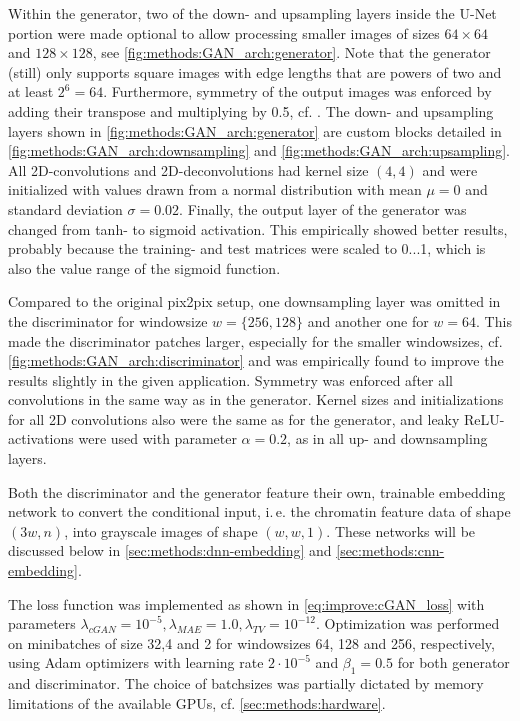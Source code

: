 Within the generator, two of the down- and upsampling layers inside the U-Net portion were made optional 
to allow processing smaller images of sizes $64\times64$ and $128\times128$, see \cref{fig:methods:GAN_arch:generator}.
Note that the generator (still) only supports square images with edge lengths that are powers of two and at least $2^6=64$.
Furthermore, symmetry of the output images was enforced by adding their transpose and multiplying by 0.5, cf. \cite{Fudenberg2020}.
The down- and upsampling layers shown in  \cref{fig:methods:GAN_arch:generator} are custom blocks 
detailed in \cref{fig:methods:GAN_arch:downsampling} and \ref{fig:methods:GAN_arch:upsampling}. 
All 2D-convolutions and 2D-deconvolutions had kernel size $(4,4)$ and were initialized with values drawn from a normal distribution with mean $\mu=0$ and
standard deviation $\sigma=0.02$.
Finally, the output layer of the generator was changed from tanh- to sigmoid activation.
This empirically showed better results, probably because the training- and test matrices were scaled to 0...1, which 
is also the value range of the sigmoid function.


Compared to the original pix2pix setup, 
one downsampling layer was omitted in the discriminator for windowsize $w=\{256,128\}$ and another one for $w=64$.
This made the discriminator patches larger, especially for the smaller windowsizes,
cf. \cref{fig:methods:GAN_arch:discriminator} and was empirically found to improve the results
slightly in the given application.
Symmetry was enforced after all convolutions in the same way as in the generator.
Kernel sizes and initializations for all 2D convolutions also were the same as for the generator,
and leaky ReLU-activations were used with parameter $\alpha=0.2$, as in all up- and downsampling layers.

Both the discriminator and the generator feature their own, trainable embedding network
to convert the conditional input, i.\,e. the chromatin feature data of shape $(3w, n)$,
into grayscale images of shape $(w,w,1)$. 
These networks will be discussed below in \cref{sec:methods:dnn-embedding}
and \cref{sec:methods:cnn-embedding}.

The loss function was implemented as shown in \cref{eq:improve:cGAN_loss}
with parameters $\lambda_\mathit{cGAN}=10^{-5}, \lambda_\mathit{MAE}=1.0, \lambda_\mathit{TV}=10^{-12}$.
Optimization was performed on minibatches of size 32,4 and 2 for windowsizes 64, 128 and 256, respectively, 
using Adam optimizers with learning rate $2\cdot10^{-5}$ and $\beta_1=0.5$ for both generator and discriminator.
The choice of batchsizes was partially dictated by memory limitations of the available GPUs, cf. \cref{sec:methods:hardware}.

